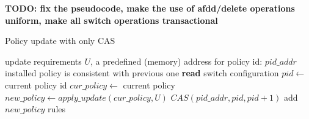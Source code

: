 \documentclass[conference]{sigcomm-alternate}
\newcommand{\hide}[1]{}
\begin{document}
\hide{
We compute our new suggested policy by applying the update requests on top of current policy, supporting any kind of requests and policies. Then we make a transaction (using the bundle feature) to atomically check that our policy id is not blocked by anyone else, to change the current policy id to ours (an action that would fail if the current policy id is no longer what we are counting of) and to actually configure our new policy.

If one of the actions in the transaction fails we try again. There is no progress guaranty for each controller but there is one for the whole system - at least one of the controller will succeed in fulfilling its update requirements.
}



\textbf{TODO: fix the pseudocode, make the use of afdd/delete
  operations uniform, make all switch operations transactional}



\begin{algorithm}[t]
    \caption{Policy update with only CAS}
    \label{alg:simple-update}
    \begin{algorithmic}[1]
    \Require update requirements $U$, a predefined (memory) address for  policy id: $pid\_addr$
    \Ensure installed policy is consistent with previous one
 		\Repeat
 			\State \textbf{read} switch configuration
 			\State $pid\gets$ current policy id 
 			\State $cur\_policy\gets$ current policy
 			\State $new\_policy\gets apply\_update(cur\_policy,U)$
 			\startTxn
	 			\State $CAS(pid\_addr,pid,pid+1)$
	 			\State add $new\_policy$ rules %
 			\endTxn
			\Return

    \end{algorithmic}
\end{algorithm}
\end{document}
